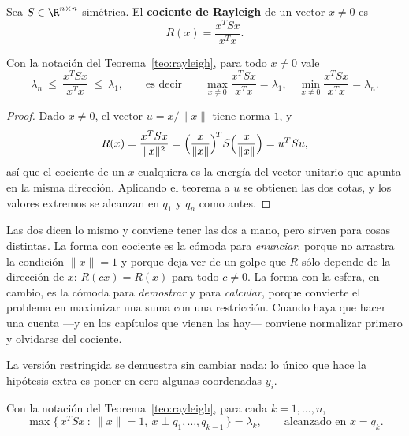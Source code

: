 \begin{definition}\label{def:rayleigh}
Sea $S\in\R^{n\times n}$ simétrica. El \textbf{cociente de Rayleigh} de un
vector $x\neq0$ es
\[
R(x)=\frac{x^TSx}{x^Tx} .
\]
\end{definition}

\begin{corollary}\label{coro:rayleigh-cociente}
Con la notación del Teorema~\ref{teo:rayleigh}, para todo $x\neq0$ vale
\[
\lambda_n\ \le\ \frac{x^TSx}{x^Tx}\ \le\ \lambda_1 ,
\qquad\text{es decir}\qquad
\max_{x\neq0}\frac{x^TSx}{x^Tx}=\lambda_1 ,
\quad
\min_{x\neq0}\frac{x^TSx}{x^Tx}=\lambda_n .
\]
\end{corollary}

\begin{proof}
Dado $x\neq0$, el vector $u=x/\|x\|$ tiene norma $1$, y
\[
R(x)=\frac{x^TSx}{\|x\|^2}
=\Bigl(\frac{x}{\|x\|}\Bigr)^{\!T}S\Bigl(\frac{x}{\|x\|}\Bigr)
=u^TSu ,
\]
así que el cociente de un $x$ cualquiera es la energía del vector unitario que
apunta en la misma dirección. Aplicando el teorema a $u$ se obtienen las dos
cotas, y los valores extremos se alcanzan en $q_1$ y $q_n$ como antes.
\end{proof}

\begin{remark}\label{obs:rayleigh-cual-usar}
Las dos dicen lo mismo y conviene tener las dos a mano, pero sirven para cosas
distintas. La forma con cociente es la cómoda para \emph{enunciar}, porque no
arrastra la condición $\|x\|=1$ y porque deja ver de un golpe que $R$ sólo
depende de la dirección de $x$: $R(cx)=R(x)$ para todo $c\neq0$. La forma con
la esfera, en cambio, es la cómoda para \emph{demostrar} y para \emph{calcular},
porque convierte el problema en maximizar una suma con una restricción.
Cuando haya que hacer una cuenta ---y en los capítulos que vienen las hay---
conviene normalizar primero y olvidarse del cociente.
\end{remark}

La versión restringida se demuestra sin cambiar nada: lo único que hace la
hipótesis extra es poner en cero algunas coordenadas $y_i$.

\begin{corollary}\label{coro:rayleigh-restringido}
Con la notación del Teorema~\ref{teo:rayleigh}, para cada $k=1,\dots,n$,
\[
\max\bigl\{\,x^TSx\ :\ \|x\|=1,\ x\perp q_1,\dots,q_{k-1}\,\bigr\}=\lambda_k ,
\qquad\text{alcanzado en } x=q_k .
\]
\end{corollary}

